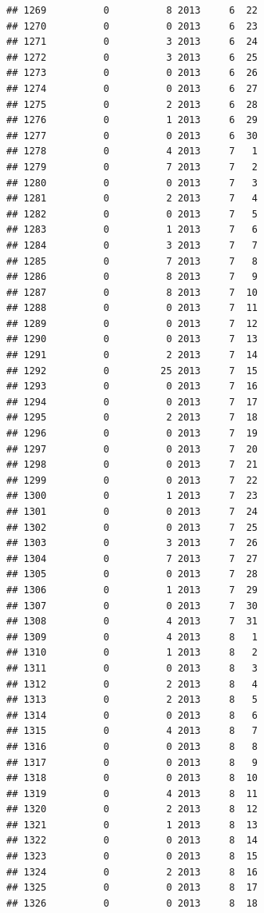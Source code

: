 \documentclass[
]{article}
\begin{document}
\begin{verbatim}
## 1269          0          8 2013     6  22
## 1270          0          0 2013     6  23
## 1271          0          3 2013     6  24
## 1272          0          3 2013     6  25
## 1273          0          0 2013     6  26
## 1274          0          0 2013     6  27
## 1275          0          2 2013     6  28
## 1276          0          1 2013     6  29
## 1277          0          0 2013     6  30
## 1278          0          4 2013     7   1
## 1279          0          7 2013     7   2
## 1280          0          0 2013     7   3
## 1281          0          2 2013     7   4
## 1282          0          0 2013     7   5
## 1283          0          1 2013     7   6
## 1284          0          3 2013     7   7
## 1285          0          7 2013     7   8
## 1286          0          8 2013     7   9
## 1287          0          8 2013     7  10
## 1288          0          0 2013     7  11
## 1289          0          0 2013     7  12
## 1290          0          0 2013     7  13
## 1291          0          2 2013     7  14
## 1292          0         25 2013     7  15
## 1293          0          0 2013     7  16
## 1294          0          0 2013     7  17
## 1295          0          2 2013     7  18
## 1296          0          0 2013     7  19
## 1297          0          0 2013     7  20
## 1298          0          0 2013     7  21
## 1299          0          0 2013     7  22
## 1300          0          1 2013     7  23
## 1301          0          0 2013     7  24
## 1302          0          0 2013     7  25
## 1303          0          3 2013     7  26
## 1304          0          7 2013     7  27
## 1305          0          0 2013     7  28
## 1306          0          1 2013     7  29
## 1307          0          0 2013     7  30
## 1308          0          4 2013     7  31
## 1309          0          4 2013     8   1
## 1310          0          1 2013     8   2
## 1311          0          0 2013     8   3
## 1312          0          2 2013     8   4
## 1313          0          2 2013     8   5
## 1314          0          0 2013     8   6
## 1315          0          4 2013     8   7
## 1316          0          0 2013     8   8
## 1317          0          0 2013     8   9
## 1318          0          0 2013     8  10
## 1319          0          4 2013     8  11
## 1320          0          2 2013     8  12
## 1321          0          1 2013     8  13
## 1322          0          0 2013     8  14
## 1323          0          0 2013     8  15
## 1324          0          2 2013     8  16
## 1325          0          0 2013     8  17
## 1326          0          0 2013     8  18

\end{verbatim}
\end{document}
